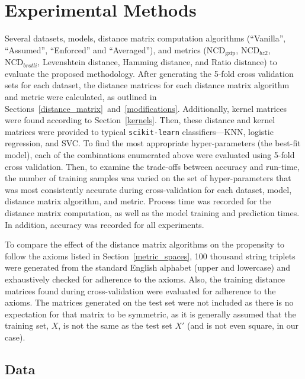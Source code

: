 \documentclass[preprint,12pt]{article}
\begin{document}
\section{Experimental Methods}
\label{methods}

Several datasets, models, distance matrix computation algorithms (``Vanilla'', ``Assumed'', ``Enforced'' and ``Averaged''), and metrics ($\text{NCD}_{\text{gzip}}$, $\text{NCD}_{bz2}$, $\text{NCD}_{brotli}$, Levenshtein distance, Hamming distance, and Ratio distance) to evaluate the proposed methodology.
After generating the 5-fold cross validation sets for each dataset, the distance matrices for each distance matrix algorithm and metric were calculated, as outlined in Sections~\ref{distance_matrix}~and~\ref{modifications}.
Additionally, kernel matrices were found according to Section~\ref{kernels}.
Then, these distance and kernel matrices were provided to typical \texttt{scikit-learn} classifiers---KNN, logistic regression, and SVC.
To find the most appropriate hyper-parameters (the best-fit model), each of the combinations enumerated above were evaluated using 5-fold cross validation. 
Then, to examine the trade-offs between accuracy and run-time, the number of training samples was varied on the set of hyper-parameters that was most consistently accurate during cross-validation for each dataset, model, distance matrix algorithm, and metric.
Process time was recorded for the distance matrix computation, as well as the model training and prediction times.
In addition, accuracy was recorded for all experiments.

To compare the effect of the distance matrix algorithms on the propensity to follow the axioms listed in Section~\ref{metric_spaces},
100 thousand string triplets were generated from the standard English alphabet (upper and lowercase) and exhaustively checked for adherence to the axioms.
Also,
the training distance matrices found during cross-validation were evaluated for adherence to the axioms.
The matrices generated on the test set were not included as there is no expectation for that matrix to be symmetric, as it is generally assumed that the training set, $X$, is not the same as the test set $X'$ (and is not even square, in our case).



\subsection{Data}
\label{datasets}
\end{document}
